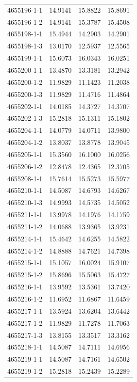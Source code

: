 \begin{longtable}{lrrr}
4655196-1-1 & 14.9141 & 15.8822 & 15.8691 \\
4655196-1-2 & 14.9141 & 15.3787 & 15.4508 \\
4655198-1-1 & 15.4944 & 14.2903 & 14.2901 \\
4655198-1-3 & 13.0170 & 12.5937 & 12.5565 \\
4655199-1-1 & 15.6073 & 16.0343 & 16.0251 \\
4655200-1-1 & 13.4870 & 13.3181 & 13.2942 \\
4655200-1-2 & 11.9829 & 11.1423 & 11.2038 \\
4655200-1-3 & 11.9829 & 11.4716 & 11.4864 \\
4655202-1-1 & 14.0185 & 14.3727 & 14.3707 \\
4655202-1-3 & 15.2818 & 15.1311 & 15.1802 \\
4655204-1-1 & 14.0779 & 14.0711 & 13.9800 \\
4655204-1-2 & 13.8037 & 13.8778 & 13.9045 \\
4655205-1-1 & 15.3560 & 16.1000 & 16.0256 \\
4655206-1-2 & 12.8478 & 12.4365 & 12.3705 \\
4655208-1-1 & 15.7614 & 15.5273 & 15.5977 \\
4655210-1-1 & 14.5087 & 14.6793 & 14.6267 \\
4655210-1-3 & 14.9993 & 14.5735 & 14.5052 \\
4655211-1-1 & 13.9978 & 14.1976 & 14.1759 \\
4655211-1-2 & 14.0688 & 13.9365 & 13.9231 \\
4655214-1-1 & 15.4642 & 14.6255 & 14.5822 \\
4655214-1-2 & 14.8888 & 14.7621 & 14.7398 \\
4655215-1-1 & 15.1057 & 16.0024 & 15.9107 \\
4655215-1-2 & 15.8696 & 15.5063 & 15.4727 \\
4655216-1-1 & 13.9592 & 13.5361 & 13.7420 \\
4655216-1-2 & 11.6952 & 11.6867 & 11.6459 \\
4655217-1-1 & 13.5924 & 13.6204 & 13.6442 \\
4655217-1-2 & 11.9829 & 11.7278 & 11.7063 \\
4655217-1-3 & 13.8155 & 13.3517 & 13.3162 \\
4655218-1-1 & 14.5087 & 14.7111 & 14.6956 \\
4655219-1-1 & 14.5087 & 14.7161 & 14.6502 \\
4655219-1-2 & 15.2818 & 15.2439 & 15.2289 \\

\end{longtable}
